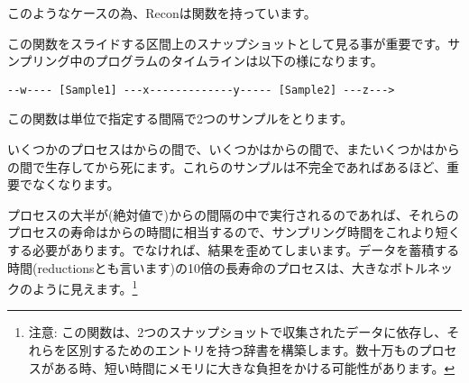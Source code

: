 このようなケースの為、Reconは関数を持っています。

この関数をスライドする区間上のスナップショットとして見る事が重要です。サンプリング中のプログラムのタイムラインは以下の様になります。

\begin{Verbatim}
--w---- [Sample1] ---x-------------y----- [Sample2] ---z--->
\end{Verbatim}

この関数は単位で指定する間隔で2つのサンプルをとります。

いくつかのプロセスはからの間で、いくつかはからの間で、またいくつかはからの間で生存してから死にます。これらのサンプルは不完全であればあるほど、重要でなくなります。

プロセスの大半が(絶対値で)からの間隔の中で実行されるのであれば、それらのプロセスの寿命はからの時間に相当するので、サンプリング時間をこれより短くする必要があります。でなければ、結果を歪めてしまいます。データを蓄積する時間(reductionsとも言います)の10倍の長寿命のプロセスは、大きなボトルネックのように見えます。\footnote{注意: この関数は、2つのスナップショットで収集されたデータに依存し、それらを区別するためのエントリを持つ辞書を構築します。数十万ものプロセスがある時、短い時間にメモリに大きな負担をかける可能性があります。}

